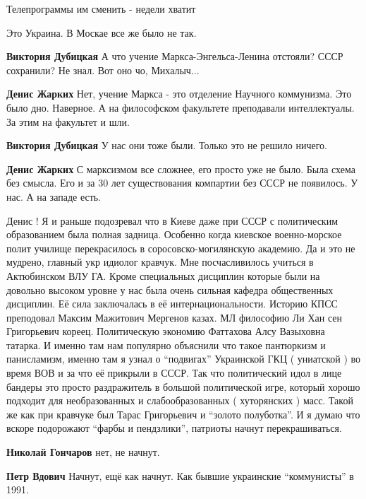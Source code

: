 \begin{itemize}
Телепрограммы им сменить - недели хватит

Это Украина. В Москае все же было не так.

\begin{itemize} %
\textbf{Виктория Дубицкая} А что учение Маркса-Энгельса-Ленина отстояли? СССР сохранили? Не знал. Вот оно чо, Михалыч...

\textbf{Денис Жарких} Нет, учение Маркса - это отделение Научного коммунизма. Это было дно. Наверное. А на философском факультете преподавали интеллектуалы. За этим на факультет и шли.

\textbf{Виктория Дубицкая} У нас они тоже были. Только это не решило ничего.

\textbf{Денис Жарких} С марксизмом все сложнее, его просто уже не было. Была схема без смысла. Его и за 30 лет существования компартии без СССР не появилось. У нас. А на западе есть.
\end{itemize} %


Денис ! Я и раньше подозревал что в Киеве даже при СССР с политическим
образованием была полная задница. Особенно когда киевское военно-морское полит
училище перекрасилось в соросовско-могилянскую академию. Да и это не мудрено,
главный укр идиолог кравчук. Мне посчасливилось учиться в Актюбинском ВЛУ ГА.
Кроме специальных дисциплин которые были на довольно высоком уровне у нас была
очень сильная кафедра общественных дисциплин. Её сила заключалась в её
интернациональности. Историю КПСС преподовал Максим Мажитович Мергенов казах.
МЛ философию Ли Хан сен Григорьевич кореец. Политическую экономию Фаттахова
Алсу Вазыховна татарка. И именно там нам популярно объяснили что такое
пантюркизм и панисламизм, именно там я узнал о \enquote{подвигах} Украинской ГКЦ (
униатской ) во время ВОВ и за что её прикрыли в СССР. Так что политический идол
в лице бандеры это просто раздражитель в большой политической игре, который
хорошо подходит для необразованных и слабообразованных ( хуторянских ) масс.
Такой же как при кравчуке был Тарас Григорьевич и \enquote{золото полуботка}. И я
думаю что вскоре подорожают \enquote{фарбы и пендзлики}, патриоты начнут
перекрашиваться.

\begin{itemize} %
\textbf{Николай Гончаров} нет, не начнут.

\textbf{Петр Вдович} Начнут, ещё как начнут. Как бывшие украинские \enquote{коммунисты} в 1991.
\end{itemize} %


\end{itemize}
